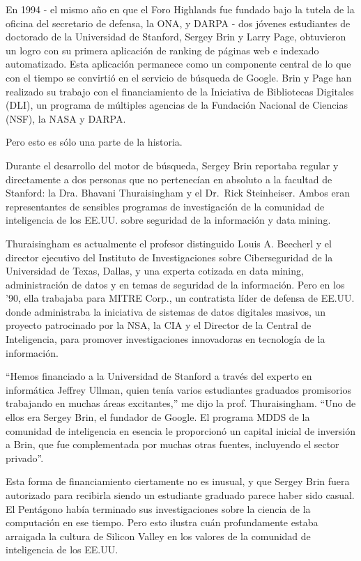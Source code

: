 \documentclass[10pt,a5paper,twoside,spanish,]{book}
\begin{document}
En 1994 - el mismo año en que el Foro Highlands fue fundado bajo la
tutela de la oficina del secretario de defensa, la ONA, y DARPA - dos
jóvenes estudiantes de doctorado de la Universidad de Stanford, Sergey
Brin y Larry Page, obtuvieron un logro con su primera aplicación de
ranking de páginas web e indexado automatizado. Esta aplicación
permanece como un componente central de lo que con el tiempo se
convirtió en el servicio de búsqueda de Google. Brin y Page han
realizado su trabajo con el financiamiento de la Iniciativa de
Bibliotecas Digitales (DLI), un programa de múltiples agencias de la
Fundación Nacional de Ciencias (NSF), la NASA y DARPA.

Pero esto es sólo una parte de la historia.

Durante el desarrollo del motor de búsqueda, Sergey Brin reportaba
regular y directamente a dos personas que no pertenecían en absoluto a
la facultad de Stanford: la Dra. Bhavani Thuraisingham y el Dr.~Rick
Steinheiser. Ambos eran representantes de sensibles programas de
investigación de la comunidad de inteligencia de los EE.UU. sobre
seguridad de la información y data mining.

Thuraisingham es actualmente el profesor distinguido Louis A. Beecherl y
el director ejecutivo del Instituto de Investigaciones sobre
Ciberseguridad de la Universidad de Texas, Dallas, y una experta
cotizada en data mining, administración de datos y en temas de seguridad
de la información. Pero en los '90, ella trabajaba para MITRE Corp., un
contratista líder de defensa de EE.UU. donde administraba la iniciativa
de sistemas de datos digitales masivos, un proyecto patrocinado por la
NSA, la CIA y el Director de la Central de Inteligencia, para promover
investigaciones innovadoras en tecnología de la información.

``Hemos financiado a la Universidad de Stanford a través del experto en
informática Jeffrey Ullman, quien tenía varios estudiantes graduados
promisorios trabajando en muchas áreas excitantes,'' me dijo la prof.
Thuraisingham. ``Uno de ellos era Sergey Brin, el fundador de Google. El
programa MDDS de la comunidad de inteligencia en esencia le proporcionó
un capital inicial de inversión a Brin, que fue complementada por muchas
otras fuentes, incluyendo el sector privado''.

Esta forma de financiamiento ciertamente no es inusual, y que Sergey
Brin fuera autorizado para recibirla siendo un estudiante graduado
parece haber sido casual. El Pentágono había terminado sus
investigaciones sobre la ciencia de la computación en ese tiempo. Pero
esto ilustra cuán profundamente estaba arraigada la cultura de Silicon
Valley en los valores de la comunidad de inteligencia de los EE.UU.
\end{document}
